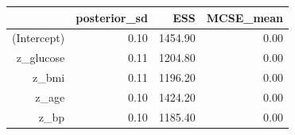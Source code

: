 \begin{table}[ht]
\centering
\begin{tabular}{rrrr}
  \hline
 & posterior\_sd & ESS & MCSE\_mean \\ 
  \hline
(Intercept) & 0.10 & 1454.90 & 0.00 \\ 
  z\_glucose & 0.11 & 1204.80 & 0.00 \\ 
  z\_bmi & 0.11 & 1196.20 & 0.00 \\ 
  z\_age & 0.10 & 1424.20 & 0.00 \\ 
  z\_bp & 0.10 & 1185.40 & 0.00 \\ 
   \hline
\end{tabular}
\end{table}
